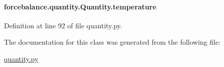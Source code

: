 \hypertarget{classforcebalance_1_1quantity_1_1Quantity_a30da0699f09b247b74014a9a1a6a2d09}{
\paragraph[{temperature}]{\setlength{\rightskip}{0pt plus 5cm}forcebalance.\-quantity.\-Quantity.\-temperature}}\label{classforcebalance_1_1quantity_1_1Quantity_a30da0699f09b247b74014a9a1a6a2d09}


Definition at line 92 of file quantity.\-py.



The documentation for this class was generated from the following file\-:\begin{DoxyCompactItemize}
\item 
\hyperlink{quantity_8py}{quantity.\-py}\end{DoxyCompactItemize}
